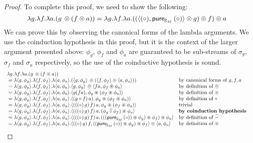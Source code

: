\begin{lemma}
\begin{proof}
To complete this proof, we need to show the following:
$$
\lambda g . \lambda f . \lambda a .(g\, \pappl (f \pappl a)) = \lambda g. \lambda f. \lambda a. ( ( \pair{(\comp)}{\apure_{\stream{M}}\,(\comp)} \pappl g ) \pappl f ) \pappl a
$$
We can prove this by observing the canonical forms of the lambda arguments. We use the coinduction hypothesis in this proof, but it is the context of the larger argument presented above: $\phi_g$, $\phi_f$ and $\phi_a$ are guaranteed to be sub-streams of $\sigma_g$, $\sigma_f$ and $\sigma_a$ respectively, so the use of the coinductive hypothesis is sound.
$$
\begin{array}{ll}
\lambda g . \lambda f . \lambda a .(g\, \pappl (f \pappl a)) \\
{}= \lambda \pair{g}{\phi_g} . \lambda \pair{f}{\phi_f} . \lambda \pair{a}{\phi_a} .( \pair{g}{\phi_g}\, \pappl (\pair{f}{\phi_f} \pappl \pair{a}{\phi_a}))
& \mbox{by canonical forms of }g, f, a\\
{}= \lambda \pair{g}{\phi_g} . \lambda \pair{f}{\phi_f} . \lambda \pair{a}{\phi_a} . \pair{g}{\phi_g}\, \pappl \pair{f a}{\phi_f \appl \phi_a}
& \mbox{by definition of }\pappl \\
{}= \lambda \pair{g}{\phi_g} . \lambda \pair{f}{\phi_f} . \lambda \pair{a}{\phi_a} .\pair{g (f a)}{\phi_g \appl (\phi_f \appl \phi_a)}
& \mbox{by definition of }\pappl \\
{}= \lambda \pair{g}{\phi_g} . \lambda \pair{f}{\phi_f} . \lambda \pair{a}{\phi_a} .\pair{(g \comp f)\, a)}{\phi_g \appl (\phi_f \appl \phi_a)}
& \mbox{by definition of }\comp \\
{}= \lambda \pair{g}{\phi_g} . \lambda \pair{f}{\phi_f} . \lambda \pair{a}{\phi_a} .\pair{(((\comp)\, g)\, f)\, a}{\phi_g \appl (\phi_f \appl \phi_a)}
& \mbox{trivial} \\
{}= \lambda \pair{g}{\phi_g} . \lambda \pair{f}{\phi_f} . \lambda \pair{a}{\phi_a} .\pair{(((\comp)\, g)\, f)\, a}{(\phi_g \alift{\comp} \phi_f) \appl \phi_a}
& \mbox{\bf by coinduction hypothesis} \\
{}= \lambda \pair{g}{\phi_g} . \lambda \pair{f}{\phi_f} . \lambda \pair{a}{\phi_a} .\pair{(((\comp)\, g)\, f)\, a}{(((\apure_{\stream{M}}\, (\comp)) \appl \phi_g) \appl \phi_f) \appl \phi_a}
& \mbox{by definition of }\alift{-} \\
{}= \lambda \pair{g}{\phi_g} . \lambda \pair{f}{\phi_f} . \lambda \pair{a}{\phi_a}.\pair{((\comp)\, g)\, f}{((\apure_{\stream{M}}\, (\comp)) \appl \phi_g) \appl \phi_f} \pappl  \pair{a}{\phi_a}
& \mbox{by definition of }\pappl \\

\end{array}$$
\end{proof}
\end{lemma}
